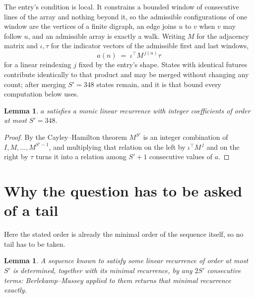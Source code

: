 \documentclass[11pt,a4paper]{article}
\theoremstyle{plain}
\newtheorem{lemma}[theorem]{Lemma}
\theoremstyle{definition}
\begin{document}
The entry's condition is local. It constrains a bounded window of consecutive lines of the
array and nothing beyond it, so the admissible configurations of one window are the vertices of
a finite digraph, an edge joins $u$ to $v$ when $v$ may follow $u$, and an admissible array is
exactly a walk. Writing $M$ for the adjacency matrix and $\iota,\tau$ for the indicator vectors
of the admissible first and last windows,
\[
a(n)\;=\;\iota^{\!\top}M^{\,j(n)}\tau
\]
for a linear reindexing $j$ fixed by the entry's shape. States with identical futures
contribute identically to that product and may be merged without changing any count; after
merging $S'=348$ states remain, and it is that bound every computation below uses.

\begin{lemma}\label{lem:cf}
$a$ satisfies a monic linear recurrence with integer coefficients of order at most $S'=348$.
\end{lemma}

\begin{proof}
By the Cayley--Hamilton theorem $M^{S'}$ is an integer combination of $I,M,\dots,M^{S'-1}$,
and multiplying that relation on the left by $\iota^{\!\top}M^{\,j}$ and on the right by
$\tau$ turns it into a relation among $S'+1$ consecutive values of $a$.
\end{proof}

\section{Why the question has to be asked of a tail}

Here the stated order is already the minimal order of the sequence itself, so no tail has to be taken.

\begin{lemma}\label{lem:bm}
A sequence known to satisfy some linear recurrence of order at most $S'$ is determined,
together with its minimal recurrence, by any $2S'$ consecutive terms: Berlekamp--Massey applied
to them returns that minimal recurrence exactly.
\end{lemma}
\end{document}
